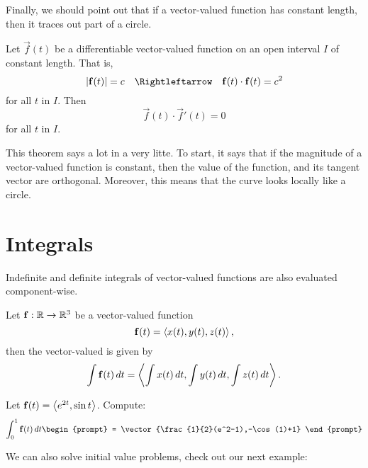 \documentclass{ximera}
\begin{document}
Finally, we should point out that if a vector-valued function has constant length, then it traces out part of a circle.
\begin{theorem}
  Let $\vec f(t)$ be a differentiable vector-valued function on an open interval $I$ of constant length. That is,
  \[
  |\vec f(t)| = c \quad\Rightleftarrow\quad \vec f(t)\cdot \vec f(t) = c^2
  \]
  for all $t$ in $I$. Then
  \[
  \vec f(t)\cdot\vec{f}'(t) = 0
  \]
  for all $t$ in $I$.
\end{theorem}
This theorem says a lot in a very litte. To start, it says that if the
magnitude of a vector-valued function is constant, then the value of
the function, and its tangent vector are orthogonal. Moreover, this
means that the curve looks locally like a circle.



\section{Integrals}

Indefinite and definite integrals of vector-valued functions are also evaluated component-wise.

\begin{theorem}
  Let $\mathbf{f}:\mathbb R \to \mathbb R^3$ be a vector-valued function
  \[
  \mathbf{f}(t) = \left\langle x(t),y(t),z(t)\right\rangle,
  \]
  then the vector-valued  is given by
  \[
  \int \mathbf{f}(t) \mathop{}\!d t= \left\langle \int x(t) \mathop{}\!d t,\int y(t)\mathop{}\!d t,\int z(t)\mathop{}\!d t\right\rangle.
  \]
\end{theorem}

\begin{question}
  Let $\mathbf f(t) = \left\langle e^{2t},\sin t\right\rangle$. Compute:
  \[
  \int_0^1 \vec f(t) \d t
  \begin{prompt}
    = \vector{\frac{1}{2}(e^2-1),-\cos(1)+1}
  \end{prompt}
  \]
\end{question}

We can also solve initial value problems, check out our next example:
\end{document}

